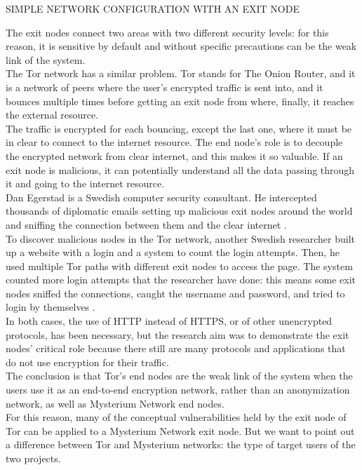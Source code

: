\documentclass[12pt]{article}
\begin{document}
	\bigbreak
	SIMPLE NETWORK CONFIGURATION WITH AN EXIT NODE\\
	\bigbreak

	The exit nodes connect two areas with two different security levels: for this reason, it is sensitive by default and without specific precautions can be the weak link of the system.\\
	The Tor network has a similar problem. Tor stands for The Onion Router, and it is a network of peers where the user's encrypted traffic is sent into, and it bounces multiple times before getting an exit node from where, finally, it reaches the external resource.\\
	The traffic is encrypted for each bouncing, except the last one, where it must be in clear to connect to the internet resource. The end node's role is to decouple the encrypted network from clear internet, and this makes it so valuable. If an exit node is malicious, it can potentially understand all the data passing through it and going to the internet resource.\\
	\bigbreak
	Dan Egerstad is a Swedish computer security consultant. He intercepted thousands of diplomatic emails setting up malicious exit nodes around the world and sniffing the connection between them and the clear internet \cite{exitnodeTOR}.\\
	To discover malicious nodes in the Tor network, another Swedish researcher built up a website with a login and a system to count the login attempts. Then, he used multiple Tor paths with different exit nodes to access the page. The system counted more login attempts that the researcher have done: this means some exit nodes sniffed the connections, caught the username and password, and tried to login by themselves \cite{exitnodeTOR2}.\\
	In both cases, the use of HTTP instead of HTTPS, or of other unencrypted protocols, has been necessary, but the research aim was to demonstrate the exit nodes' critical role because there still are many protocols and applications that do not use encryption for their traffic.\\
	The conclusion is that Tor's end nodes are the weak link of the system when the users use it as an end-to-end encryption network, rather than an anonymization network, as well as Mysterium Network end nodes.\\
	For this reason, many of the conceptual vulnerabilities held by the exit node of Tor can be applied to a Mysterium Network exit node. But we want to point out a difference between Tor and Mysterium networks: the type of target users of the two projects.\\
\end{document}

